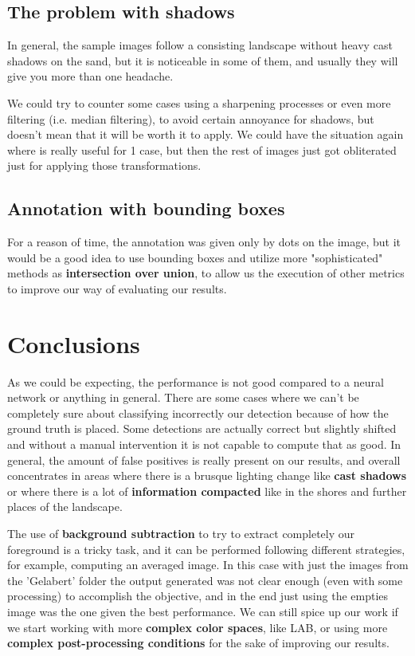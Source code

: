 \documentclass[10pt]{article}
\begin{document}
\subsection*{The problem with shadows}

In general, the sample images follow a consisting landscape without heavy cast shadows on the sand, but it is noticeable in some of them, and usually they will give you more than one headache.\medskip

We could try to counter some cases using a sharpening processes or even more filtering (i.e. median filtering), to avoid certain annoyance for shadows, but doesn't mean that it will be worth it to apply. We could have the situation again where is really useful for 1 case, but then the rest of images just got obliterated just for applying those transformations.


\subsection*{Annotation with bounding boxes}
For a reason of time, the annotation was given only by dots on the image, but it would be a good idea to use bounding boxes and utilize more "sophisticated" methods as \textbf{intersection over union}, to allow us the execution of other metrics to improve our way of evaluating our results.

\section{Conclusions}

As we could be expecting, the performance is not good compared to a neural network or anything in general. There are some cases where we can't be completely sure about classifying incorrectly our detection because of how the ground truth is placed. Some detections are actually correct but slightly shifted and without a manual intervention it is not capable to compute that as good. In general, the amount of false positives is really present on our results, and overall concentrates in areas where there is a brusque lighting change like \textbf{cast shadows} or where there is a lot of \textbf{information compacted} like in the shores and further places of the landscape.\medskip

The use of \textbf{background subtraction} to try to extract completely our foreground is a tricky task, and it can be performed following different strategies, for example, computing an averaged image. In this case with just the images from the 'Gelabert' folder the output generated was not clear enough (even with some processing) to accomplish the objective, and in the end just using the empties image was the one given the best performance. We can still spice up our work if we start working with more \textbf{complex color spaces}, like LAB, or using more \textbf{complex post-processing conditions} for the sake of improving our results.\medskip
\end{document}
